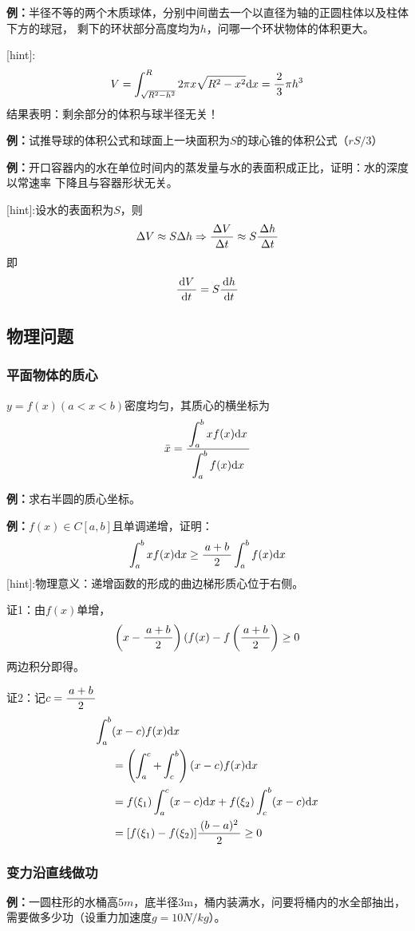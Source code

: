 {\bf 例：}半径不等的两个木质球体，分别中间凿去一个以直径为轴的正圆柱体以及柱体下方的球冠，
剩下的环状部分高度均为$h$，问哪一个环状物体的体积更大。

[hint]:
$$V=\displaystyle\int_{\sqrt{R^2-h^2}}^R2\pi x\sqrt{R^2-x^2}\mathrm{d} x=\displaystyle\frac{\,{2}\,}{\,{3}\,}\pi h^3$$
结果表明：剩余部分的体积与球半径无关！

{\bf 例：}试推导球的体积公式和球面上一块面积为$S$的球心锥的体积公式（$rS/3$）

{\bf 例：}开口容器内的水在单位时间内的蒸发量与水的表面积成正比，证明：水的深度以常速率
下降且与容器形状无关。

[hint]:设水的表面积为$S$，则
$$\Delta V\approx S\Delta h\Rightarrow
\displaystyle\frac{\,{\Delta V}\,}{\,{\Delta t}\,}\approx S\displaystyle\frac{\,{\Delta h}\,}{\,{\Delta t}\,}$$
即
$$\displaystyle\frac{\,{\mathrm{d} V}\,}{\,{\mathrm{d} t}\,}=S\displaystyle\frac{\,{\mathrm{d} h}\,}{\,{\mathrm{d} t}\,}$$

\subsection{物理问题}

\subsubsection{平面物体的质心}
$y=f(x)(a<x<b)$密度均匀，其质心的横坐标为
$$\bar{x}=\displaystyle\frac{\,{\displaystyle\int_a^bxf(x)\mathrm{d} x}\,}{\,{\displaystyle\int_a^bf(x)\mathrm{d} x}\,}$$

{\bf 例：}求右半圆的质心坐标。

{\bf 例：}$f(x)\in C[a,b]$且单调递增，证明：
$$\displaystyle\int_a^bxf(x)\mathrm{d} x\geq\displaystyle\frac{\,{a+b}\,}{\,{2}\,}\displaystyle\int_a^bf(x)\mathrm{d} x$$
[hint]:物理意义：递增函数的形成的曲边梯形质心位于右侧。

证1：由$f(x)$单增，
$$\left(x-\displaystyle\frac{\,{a+b}\,}{\,{2}\,}\right)\left(f(x\right)-f\left(
\displaystyle\frac{\,{a+b}\,}{\,{2}\,}\right)\geq0$$
两边积分即得。

证2：记$c=\displaystyle\frac{\,{a+b}\,}{\,{2}\,}$
\begin{align}
	\displaystyle\int_a^b&(x-c)f(x)\mathrm{d} x\notag\\
	&=\left(\displaystyle\int_a^c+\displaystyle\int_c^b\right)(x-c)f(x)\mathrm{d} x\notag\\
	&=f(\xi_1)\displaystyle\int_a^c(x-c)\mathrm{d} x+f(\xi_2)\displaystyle\int_c^b(x-c)\mathrm{d} x\notag\\
	&=[f(\xi_1)-f(\xi_2)]\displaystyle\frac{\,{(b-a)^2}\,}{\,{2}\,}\geq0
\end{align}

\subsubsection{变力沿直线做功}

{\bf 例：}一圆柱形的水桶高$5m$，底半径$3$m，桶内装满水，问要将桶内的水全部抽出，
需要做多少功（设重力加速度$g=10N/kg$）。

